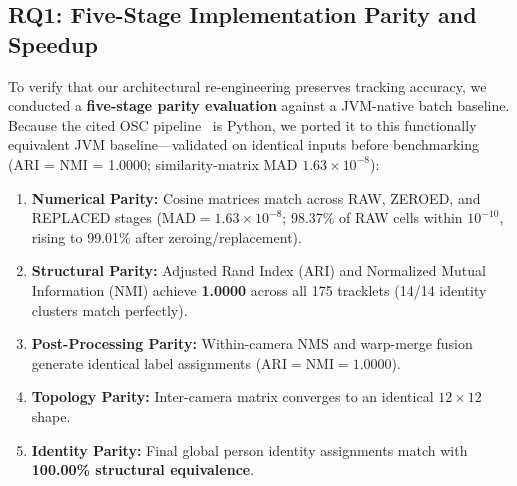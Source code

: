 \documentclass[conference]{IEEEtran}
\begin{document}
\subsection{RQ1: Five-Stage Implementation Parity and Speedup}
To verify that our architectural re-engineering preserves tracking accuracy, we conducted a \textbf{five-stage parity evaluation} against a JVM-native batch baseline. Because the cited OSC pipeline~\cite{yoshida2024overlap} is Python, we ported it to this functionally equivalent JVM baseline---validated on identical inputs before benchmarking (ARI = NMI = 1.0000; similarity-matrix MAD $1.63\times10^{-8}$):
\begin{enumerate}
    \item \textbf{Numerical Parity:} Cosine matrices match across RAW, ZEROED, and REPLACED stages ($\text{MAD} = 1.63 \times 10^{-8}$; 98.37\% of RAW cells within $10^{-10}$, rising to 99.01\% after zeroing/replacement).
    \item \textbf{Structural Parity:} Adjusted Rand Index ($\text{ARI}$) and Normalized Mutual Information ($\text{NMI}$) achieve \textbf{1.0000} across all 175 tracklets (14/14 identity clusters match perfectly).
    \item \textbf{Post-Processing Parity:} Within-camera NMS and warp-merge fusion generate identical label assignments ($\text{ARI} = \text{NMI} = 1.0000$).
    \item \textbf{Topology Parity:} Inter-camera matrix converges to an identical $12\times 12$ shape.
    \item \textbf{Identity Parity:} Final global person identity assignments match with \textbf{100.00\% structural equivalence}.
\end{enumerate}
\end{document}
